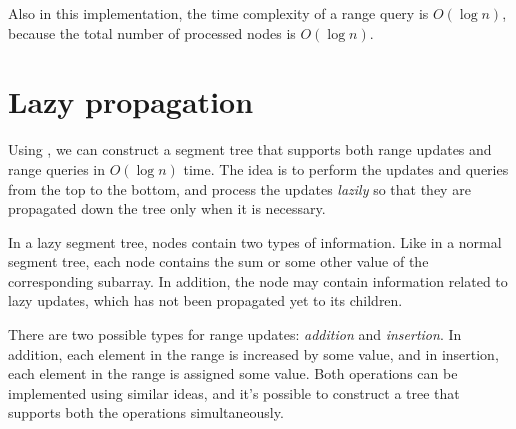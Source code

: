 \begin{center}
\end{center}
Also in this implementation,
the time complexity of a range query is $O(\log n)$,
because the total number of processed nodes is $O(\log n)$.

\section{Lazy propagation}


Using , we can construct
a segment tree that supports both range updates
and range queries in $O(\log n)$ time.
The idea is to perform the updates and queries
from the top to the bottom, and process the updates
\emph{lazily} so that they are propagated
down the tree only when it is necessary.

In a lazy segment tree, nodes contain two types of
information.
Like in a normal segment tree,
each node contains the sum or some other value
of the corresponding subarray.
In addition, the node may contain information
related to lazy updates, which has not been
propagated yet to its children.

There are two possible types for range updates:
\emph{addition} and \emph{insertion}.
In addition, each element in the range is
increased by some value,
and in insertion, each element in the range
is assigned some value.
Both operations can be implemented using
similar ideas, and it's possible to construct
a tree that supports both the operations
simultaneously.


